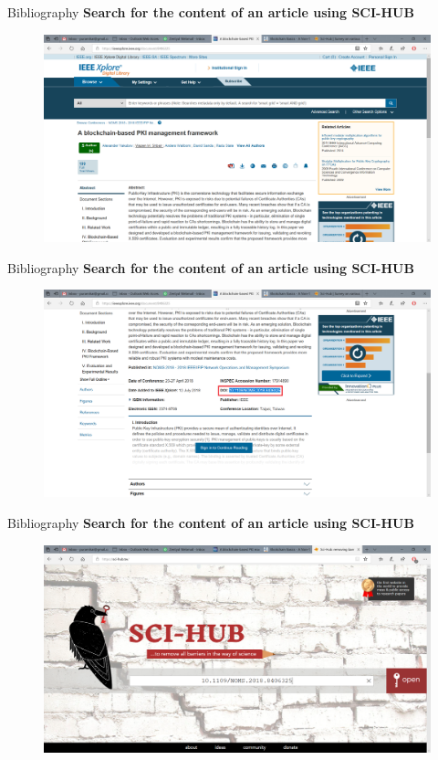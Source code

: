 \documentclass[pdf]{beamer}
\begin{document}
\begin{frame}{Bibliography}
\textbf{Search for the content of an article using SCI-HUB}
\begin{figure}[t]
\centering
\includegraphics[scale=0.3]{Images/a}
\end{figure}
\end{frame}



\begin{frame}{Bibliography}
\textbf{Search for the content of an article using SCI-HUB}
\begin{figure}[t]
\centering
\includegraphics[scale=0.3]{Images/b}
\end{figure}
\end{frame}



\begin{frame}{Bibliography}
\textbf{Search for the content of an article using SCI-HUB}
\begin{figure}[t]
\centering
\includegraphics[scale=0.3]{Images/c}
\end{figure}
\end{frame}
\end{document}
